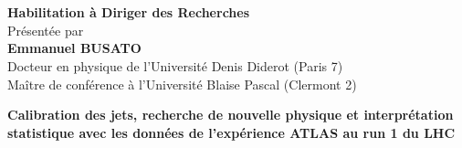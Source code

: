 \begin{titlepage}
\vspace*{-3cm}

\vspace*{3.2cm}

\begin{center}
 \\
\vspace*{0.3cm}
 \\
\vspace*{0.5cm}
\noindent \huge \textbf{Habilitation \`a Diriger des Recherches} \\
\vspace*{0.5cm}
\vspace*{0.4cm}
\noindent \large {Présentée par\\}
\vspace*{0.4cm}
\noindent \LARGE \textbf{Emmanuel \textsc{BUSATO}} \\
\vspace*{0.4cm}
\noindent \large {Docteur en physique de l'Universit\'e Denis Diderot (Paris 7)\\}
\vspace*{0.1cm}
\noindent \large {Ma\^itre de conf\'erence \`a l'Universit\'e Blaise Pascal (Clermont 2)\\}
\vspace*{0.8cm}
\vspace*{0.4cm}

\vspace*{0.5cm}
\noindent \LARGE \textbf{Calibration des jets, recherche de nouvelle physique et interpr\'etation statistique avec les donn\'ees de l'exp\'erience ATLAS au run 1 du LHC} \\
\vspace*{0.5cm}


\end{center}
\end{titlepage}
